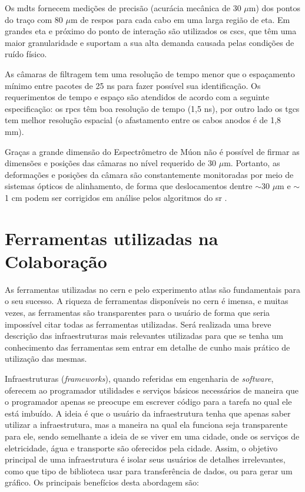 Os \glspl{mdt} fornecem medições de precisão (acurácia mecânica de 30 $\mu$m) 
dos pontos do traço com 80 $\mu$m de \gls{respos}
para cada cabo em uma larga região de \gls{eta}. Em grandes \gls{eta} e próximo
do ponto de interação são utilizados os \glspl{csc}, que têm uma maior
granularidade e suportam a sua alta demanda causada pelas condições de ruído
físico.
 
As câmaras de filtragem tem uma resolução de tempo menor que o espaçamento
mínimo entre pacotes de 25 ns para fazer possível sua identificação. Os
requerimentos de tempo e espaço são atendidos de acordo com a seguinte
especificação: os \glspl{rpc} têm boa resolução de tempo (1,5 ns), por outro
lado os \glspl{tgc} tem melhor resolução espacial 
(o afastamento entre os cabos anodos é de 1,8 mm).

Graças a grande dimensão do Espectrômetro de Múon não é possível de firmar as
dimensões e posições das câmaras no nível requerido de 30 $\mu$m. Portanto, as
deformações e posições da câmara são constantemente monitoradas por meio de
sistemas ópticos de alinhamento, de forma que deslocamentos dentre $\sim$30
$\mu$m e $\sim$1 cm podem ser corrigidos em análise pelos algoritmos do
\glsdesc{sr} \cite{muon_tdr}.

\section{Ferramentas utilizadas na Colaboração}
\label{sec:ferramentas}

As ferramentas utilizadas no \gls{cern} e pelo experimento \gls{atlas} são
fundamentais para o seu sucesso. A riqueza de ferramentas disponíveis
no \gls{cern} é imensa, e muitas vezes, as ferramentas são
transparentes para o usuário de forma que seria impossível citar todas as 
ferramentas utilizadas. Será realizada uma breve descrição das infraestruturas 
mais relevantes utilizadas para que se tenha um conhecimento das ferramentas 
sem entrar em detalhe de cunho mais prático de utilização das mesmas.

Infraestruturas \cite{root} (\emph{frameworks}), 
quando referidas em engenharia de \emph{software},
oferecem ao programador utilidades e serviços básicos necessários de maneira que
o programador apenas se preocupe em escrever código para a tarefa no qual ele
está imbuído. A ideia é que o usuário da infraestrutura tenha que apenas saber
utilizar a infraestrutura, mas a maneira na qual ela funciona seja transparente
para ele, sendo semelhante a ideia de se viver em uma cidade, onde os serviços
de eletricidade, água e transporte são oferecidos pela cidade. Assim, o objetivo
principal de uma infraestrutura é isolar seus usuários de detalhes irrelevantes,
como que tipo de biblioteca usar para transferência de dados, ou para gerar um
gráfico. Os principais benefícios desta abordagem são:

